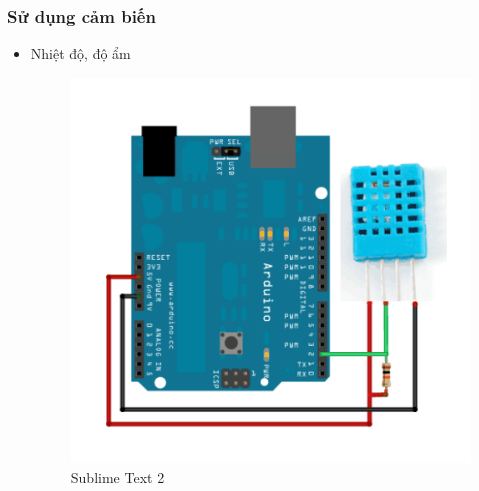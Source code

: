 \documentclass[a4paper,12pt,oneside]{article}
\begin{document}
\subsubsection{Sử dụng cảm biến}
\begin{itemize}
\item Nhiệt độ, độ ẩm
\begin{center}
\begin{figure}[h!]
\begin{center}
\includegraphics[scale=0.4]{hinh/dht.png}
\end{center}
\caption{Sublime Text 2}
\end{figure}
\end{center}


\end{itemize}
\end{document}
